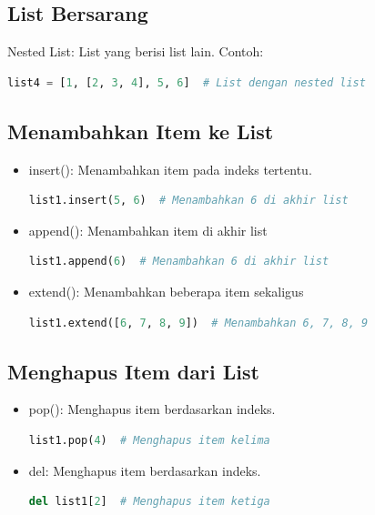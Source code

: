 \documentclass{article}
\begin{document}
\subsection{List Bersarang}
Nested List: List yang berisi list lain. Contoh:
\begin{lstlisting}[language=Python, caption={}, captionpos=b]
list4 = [1, [2, 3, 4], 5, 6]  # List dengan nested list
\end{lstlisting}

\subsection{Menambahkan Item ke List}
\begin{itemize}
    \item insert(): Menambahkan item pada indeks tertentu.
          \begin{lstlisting}[language=Python, caption={}, captionpos=b]
list1.insert(5, 6)  # Menambahkan 6 di akhir list
\end{lstlisting}
    \item append(): Menambahkan item di akhir list
          \begin{lstlisting}[language=Python, caption={}, captionpos=b]
list1.append(6)  # Menambahkan 6 di akhir list
\end{lstlisting}
    \item extend(): Menambahkan beberapa item sekaligus
          \begin{lstlisting}[language=Python, caption={}, captionpos=b]
list1.extend([6, 7, 8, 9])  # Menambahkan 6, 7, 8, 9
\end{lstlisting}
\end{itemize}

\subsection{Menghapus Item dari List}
\begin{itemize}
    \item pop(): Menghapus item berdasarkan indeks.
          \begin{lstlisting}[language=Python, caption={}, captionpos=b]
list1.pop(4)  # Menghapus item kelima
\end{lstlisting}
    \item del: Menghapus item berdasarkan indeks.
          \begin{lstlisting}[language=Python, caption={}, captionpos=b]
del list1[2]  # Menghapus item ketiga
\end{lstlisting}
\end{itemize}
\end{document}
